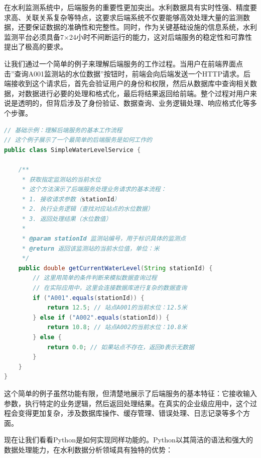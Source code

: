 在水利监测系统中，后端服务的重要性更加突出。水利数据具有实时性强、精度要求高、关联关系复杂等特点，这要求后端系统不仅要能够高效处理大量的监测数据，还要保证数据的准确性和完整性。同时，作为关键基础设施的信息系统，水利监测平台必须具备7×24小时不间断运行的能力，这对后端服务的稳定性和可靠性提出了极高的要求。

让我们通过一个简单的例子来理解后端服务的工作过程。当用户在前端界面点击''查询A001监测站的水位数据''按钮时，前端会向后端发送一个HTTP请求。后端接收到这个请求后，首先会验证用户的身份和权限，然后从数据库中查询相关数据，对数据进行必要的处理和格式化，最后将结果返回给前端。整个过程对用户来说是透明的，但背后涉及了身份验证、数据查询、业务逻辑处理、响应格式化等多个步骤。

\begin{lstlisting}[language=Java]
// 基础示例：理解后端服务的基本工作流程
// 这个例子展示了一个最简单的后端服务是如何工作的
public class SimpleWaterLevelService {
    
    /**
     * 获取指定监测站的当前水位
     * 这个方法演示了后端服务处理业务请求的基本流程：
     * 1. 接收请求参数（stationId）
     * 2. 执行业务逻辑（查找对应站点的水位数据）
     * 3. 返回处理结果（水位数值）
     * 
     * @param stationId 监测站编号，用于标识具体的监测点
     * @return 返回该监测站的当前水位值，单位：米
     */
    public double getCurrentWaterLevel(String stationId) {
        // 这里用简单的条件判断来模拟数据查询过程
        // 在实际应用中，这里会连接数据库进行复杂的数据查询
        if ("A001".equals(stationId)) {
            return 12.5; // 站点A001的当前水位：12.5米
        } else if ("A002".equals(stationId)) {
            return 10.8; // 站点A002的当前水位：10.8米
        } else {
            return 0.0; // 如果站点不存在，返回0表示无数据
        }
    }
}
\end{lstlisting}

这个简单的例子虽然功能有限，但清楚地展示了后端服务的基本特征：它接收输入参数，执行特定的业务逻辑，然后返回处理结果。在真实的企业级应用中，这个过程会变得更加复杂，涉及数据库操作、缓存管理、错误处理、日志记录等多个方面。

现在让我们看看Python是如何实现同样功能的。Python以其简洁的语法和强大的数据处理能力，在水利数据分析领域具有独特的优势：

